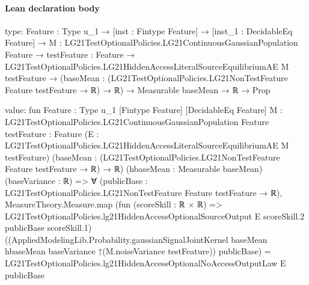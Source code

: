 \documentclass[10pt]{article}
\begin{document}
\paragraph{Lean declaration body}
\begin{ReviewVerbatim}
type:
{Feature : Type u_1} →
  [inst : Fintype Feature] →
    [inst_1 : DecidableEq Feature] →
      {M : LG21TestOptionalPolicies.LG21ContinuousGaussianPopulation Feature} →
        {testFeature : Feature} →
          LG21TestOptionalPolicies.LG21HiddenAccessLiteralSourceEquilibriumAE M testFeature →
            (baseMean : (LG21TestOptionalPolicies.LG21NonTestFeature Feature testFeature → ℝ) → ℝ) →
              Measurable baseMean → ℝ → Prop

value:
fun {Feature : Type u_1} [Fintype Feature] [DecidableEq Feature]
    {M : LG21TestOptionalPolicies.LG21ContinuousGaussianPopulation Feature} {testFeature : Feature}
    (E : LG21TestOptionalPolicies.LG21HiddenAccessLiteralSourceEquilibriumAE M testFeature)
    (baseMean : (LG21TestOptionalPolicies.LG21NonTestFeature Feature testFeature → ℝ) → ℝ)
    (hbaseMean : Measurable baseMean) (baseVariance : ℝ) =>
  ∀ (publicBase : LG21TestOptionalPolicies.LG21NonTestFeature Feature testFeature → ℝ),
    MeasureTheory.Measure.map
        (fun (scoreSkill : ℝ × ℝ) =>
          LG21TestOptionalPolicies.lg21HiddenAccessOptionalSourceOutput E scoreSkill.2 publicBase scoreSkill.1)
        ((AppliedModelingLib.Probability.gaussianSignalJointKernel baseMean hbaseMean baseVariance
            ↑(M.noiseVariance testFeature))
          publicBase) =
      LG21TestOptionalPolicies.lg21HiddenAccessOptionalNoAccessOutputLaw E publicBase
\end{ReviewVerbatim}
\end{document}
